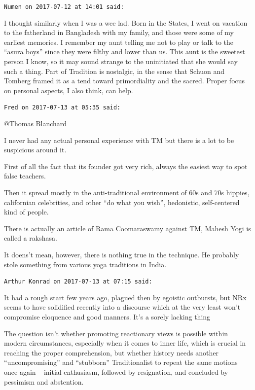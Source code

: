 \begin{footnotesize}
\begin{sffamily}
\hfill

\texttt{Numen on 2017-07-12 at 14:01 said:}

I thought similarly when I was a wee lad. Born in the States, I went on vacation to the fatherland in Bangladesh with my family, and those were some of my earliest memories. I remember my aunt telling me not to play or talk to the ``asura boys'' since they were filthy and lower than us. This aunt is the sweetest person I know, so it may sound strange to the uninitiated that she would say such a thing. Part of Tradition is nostalgic, in the sense that Schuon and Tomberg framed it as a tend toward primordiality and the sacred. Proper focus on personal aspects, I also think, can help.

\hfill

\texttt{Fred on 2017-07-13 at 05:35 said:}

@Thomas Blanchard

I never had any actual personal experience with TM but there is a lot to be suspicious around it.

First of all the fact that its founder got very rich, always the easiest way to spot false teachers.

Then it spread mostly in the anti-traditional environment of 60s and 70s hippies, californian celebrities, and other ``do what you wish'', hedonistic, self-centered kind of people.

There is actually an article of Rama Coomaraswamy against TM, Mahesh Yogi is called a rakshasa.

It doens't mean, however, there is nothing true in the technique. He probably stole something from various yoga traditions in India.

\hfill

\texttt{Arthur Konrad on 2017-07-13 at 07:15 said:}

It had a rough start few years ago, plagued then by egoistic outbursts, but NRx seems to have solidified recently into a discourse which at the very least won't compromise eloquence and good manners. It's a sorely lacking thing

The question isn't whether promoting reactionary views is possible within modern circumstances, especially when it comes to inner life, which is crucial in reaching the proper comprehension, but whether history needs another ``uncompromising'' and ``stubborn'' Traditionalist to repeat the same motions once again -- initial enthusiasm, followed by resignation, and concluded by pessimism and abstention.


\end{sffamily}
\end{footnotesize}
